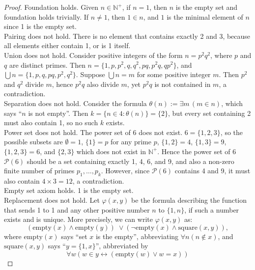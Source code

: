 \documentclass{article}
\begin{document}
\begin{enumerate}
\begin{proof}
      Foundation holds. Given $n\in\mathbb{N}^+$, if $n=1$, then $n$ is the
      empty set and foundation holds trivially. If $n\neq 1$, then $1\in
      n$, and $1$ is the minimal element of $n$ since 1 is the empty set.
      \\

      Pairing does not hold. There is no element that contains exactly 2
      and 3, because all elements either contain 1, or is 1 itself. \\

      Union does not hold. Consider positive integers of the form
      $n=p^2q^2$, where $p$ and $q$ are distinct primes. Then
      $n=\{1,p,p^2,q,q^2,pq,p^2q,qp^2\}$, and $\bigcup
      n=\{1,p,q,pq,p^2,q^2\}$. Suppose $\bigcup n=m$ for some positive
      integer $m$. Then $p^2$ and $q^2$ divide $m$, hence $p^2q$ also
      divide $m$, yet $p^2q$ is not contained in $m$, a contradiction. \\

      Separation does not hold. Consider the formula $\theta(n):=\exists
      m\,(m\in n)$, which says ``$n$ is not empty''. Then
      $k=\{n\in4:\theta(n)\}=\{2\}$, but every set containing 2 must also
      contain 1, so no such $k$ exists. \\

      Power set does not hold. The power set of $6$ does not exist.
      $6=\{1,2,3\}$, so the possible subsets are $\emptyset=1$,
      $\{1\}=p$ for any prime $p$, $\{1,2\}=4$, $\{1,3\}=9$, $\{1,2,3\}=6$,
      and $\{2,3\}$ which does not exist in $\mathbb{N}^+$. Hence the power
      set of 6 $\mathcal{P}(6)$ should be a set containing exactly 1, 4, 6,
      and 9, and also a non-zero finite number of primes $p_1,\ldots,p_k$.
      However, since $\mathcal{P}(6)$ contains 4 and 9, it must also contain
      $4\times3=12$, a contradiction. \\

      Empty set axiom holds. 1 is the empty set. \\

      Replacement does not hold. Let $\varphi(x,y)$ be the formula
      describing the function that sends 1 to 1 and any other positive
      number $n$ to $\{1,n\}$, if such a number exists and is unique. More
      precisely, we can write $\varphi(x,y)$ as:
      \begin{equation*}
        (\text{empty}(x)\wedge\text{empty}(y))\; \vee
        (\neg\text{empty}(x)\wedge \text{square}(x,y)),
      \end{equation*}
      where $\text{empty}(x)$ says ``set $x$ is the empty'', abbreviating
      $\forall n (n\not\in x)$, and $\text{square}(x,y)$ says ``$y=\{1,x\}$'',
      abbreviated by
      \begin{equation*}
        \forall w (w\in y \leftrightarrow (\text{empty}(w)\vee w=x))
      \end{equation*}


\end{proof}
\end{enumerate}
\end{document}
